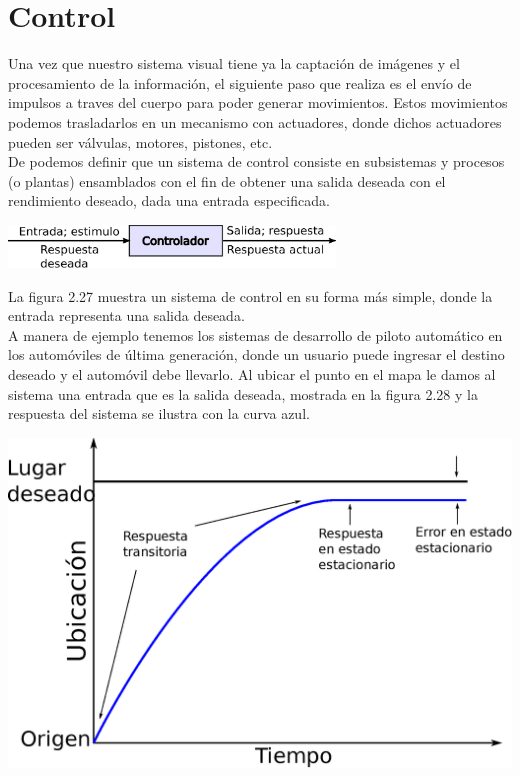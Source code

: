 \section{Control}
Una vez que nuestro sistema visual tiene ya la captación de imágenes y el procesamiento de
la información, el siguiente paso que realiza es el envío de impulsos a traves del cuerpo para
poder generar movimientos. Estos movimientos podemos trasladarlos en un mecanismo con actuadores,
donde dichos actuadores pueden ser válvulas, motores, pistones, etc.\\
De \cite{Book:Nise2010} podemos definir que un sistema de control consiste en subsistemas y procesos
(o plantas) ensamblados con el fin de obtener una salida deseada con el rendimiento deseado, dada una
entrada especificada.
\begin{center}
	\includegraphics[width=0.65\textwidth]{Contenido/Cuerpo/Capitulo2/Fig22.eps}
	\label{fig:MarcoTeorico:Fig25}
\end{center}
La figura 2.27 muestra un sistema de control en su forma más simple, donde la entrada representa
una salida deseada.\\
A manera de ejemplo tenemos los sistemas de desarrollo de piloto automático en los automóviles de
última generación, donde un usuario puede ingresar el destino deseado y el automóvil debe llevarlo.
Al ubicar el punto en el mapa le damos al sistema una entrada que es la salida deseada, mostrada
en la figura 2.28 y la respuesta del sistema se ilustra con la curva azul.
\begin{center}
	\includegraphics[width=0.85 \textwidth]{Contenido/Cuerpo/Capitulo2/Fig23.eps}
	\label{fig:MarcoTeorico:Fig25}
\end{center}

